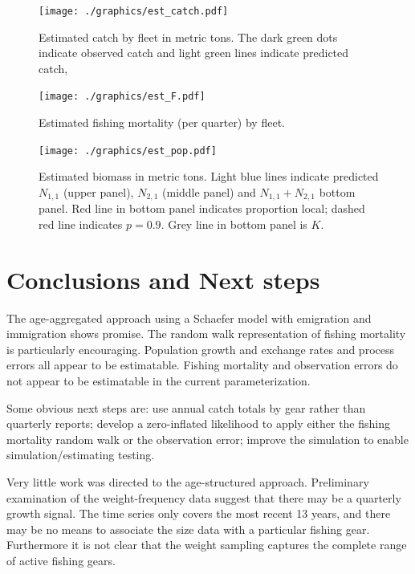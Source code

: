 \documentclass[12pt,letterpaper]{article}
\newcommand\None{{N_{1,1}}}
\newcommand\Ntwo{{N_{2,1}}}
\newcommand\Nsum{{N_{1,1}+N_{2,1}}}
\begin{document}
\begin{figure}
\begin{center}
\texttt{[image: ./graphics/est\_catch.pdf]}
\caption{\label{fig:estC}
Estimated catch by fleet in metric tons. 
The dark green dots indicate observed catch
and light green lines indicate predicted catch,
}
\end{center}
\end{figure}

\begin{figure}
\begin{center}
\texttt{[image: ./graphics/est\_F.pdf]}
\caption{\label{fig:estF}
Estimated fishing mortality (per quarter) by fleet.
}
\end{center}
\end{figure}

\begin{figure}
\begin{center}
\texttt{[image: ./graphics/est\_pop.pdf]}
\caption{\label{fig:estB}
Estimated biomass in metric tons. 
Light blue lines indicate predicted $\None$ (upper
panel), $\Ntwo$ (middle panel) and $\Nsum$ bottom panel. Red line in
bottom panel indicates proportion local; dashed red line indicates
$p=0.9$. Grey line in bottom panel is $K$.
}
\end{center}
\end{figure}

\section*{Conclusions and Next steps}

The age-aggregated approach using a Schaefer model with emigration and
immigration shows promise. The random walk
representation of fishing mortality is particularly encouraging.
Population growth and exchange rates and process errors all 
appear to be estimatable. 
Fishing mortality and observation
errors do not appear to be estimatable in the current parameterization.

Some obvious next steps are: use annual catch totals by gear rather
than quarterly reports; develop a zero-inflated likelihood to apply 
either the fishing mortality random walk or the observation error; improve the
simulation to enable simulation/estimating testing.

Very little work was directed to the age-structured approach.
Preliminary examination of the weight-frequency data suggest that
there may be a quarterly growth signal. The time series only covers
the most recent 13 years, and there may be no means to associate the
size data with a particular fishing gear. Furthermore it is not clear
that the weight sampling captures the complete range of active fishing
gears.
\end{document}
